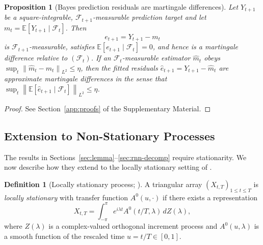 \documentclass[bj,authoryear]{imsart}
\theoremstyle{plain}
\newtheorem{proposition}[theorem]{Proposition}
\theoremstyle{definition}
\newtheorem{definition}[theorem]{Definition}
\newcommand{\E}{\mathbb{E}}
\newcommand{\F}{\mathcal{F}}
\newcommand{\norm}[1]{\left\lVert #1 \right\rVert}
\newcommand{\given}{\mid}
\begin{document}
\begin{proposition}[Bayes prediction residuals are martingale differences]
\label{prop:predresid}
  Let $Y_{t+1}$ be a square-integrable, $\F_{t+1}$-measurable prediction target and let
  $m_t=\E[Y_{t+1}\given\F_t]$.  Then
  \[
    e_{t+1}=Y_{t+1}-m_t
  \]
  is $\F_{t+1}$-measurable, satisfies $\E[e_{t+1}\given\F_t]=0$, and hence is a martingale difference relative to $(\F_t)$.  If an $\F_t$-measurable estimator
  $\hat m_t$ obeys $\sup_t\norm{\hat m_t-m_t}_{L^2}\leq\eta$, then the fitted
  residuals $\hat e_{t+1}=Y_{t+1}-\hat m_t$ are approximate martingale
  differences in the sense that
  $\sup_t\norm{\E[\hat e_{t+1}\given\F_t]}_{L^2}\leq\eta$.
\end{proposition}

\begin{proof}
  See Section~\ref{app:proofs} of the Supplementary Material.
\end{proof}


\subsection{Extension to Non-Stationary Processes}
\label{sec:nonstationary}

The results in Sections~\ref{sec:lemma}--\ref{sec:rnn-decomp} require
stationarity.  We now describe how they extend to the locally stationary
setting of \citet{dahlhaus1997fitting}.

\begin{definition}[Locally stationary process; \citealt{dahlhaus1997fitting}]
\label{def:ls}
  A triangular array $(X_{t,T})_{1\leq t\leq T}$ is \emph{locally stationary}
  with transfer function $A^0(u,\cdot)$ if there exists a representation
  \[
    X_{t,T} = \int_{-\pi}^{\pi} e^{i\lambda t} A^0(t/T, \lambda)\,dZ(\lambda),
  \]
  where $Z(\lambda)$ is a complex-valued orthogonal increment process and
  $A^0(u,\lambda)$ is a smooth function of the rescaled time $u = t/T \in [0,1]$.
\end{definition}
\end{document}
